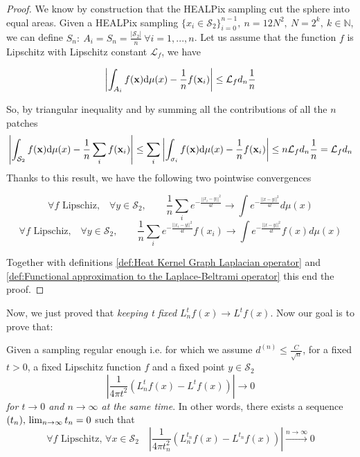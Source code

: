 \begin{proof}
	We know by construction that the HEALPix sampling cut the sphere into equal areas. Given a HEALPix sampling $\{x_i\in\mathcal S_2\}_{i=0}^{n-1},\ n=12N^2,\ N=2^k,\ k\in\mathbb N$, we can define $S_n: \ A_i=S_n=\frac{|\mathcal S_2|}{n}\ \forall i=1, ..., n$.
	Let us assume that the function $f$ is Lipschitz with Lipschitz constant $\mathcal L_f$, we have 
	
	$$\left| \int_{A_{i}}f({\bf x})\text{d}{\mu(x)} - \frac{1}{n}f(\mathbf x_i)\right| \leq \mathcal L_fd_{n}\frac{1}{n} $$

	So, by triangular inequality and by summing all the contributions of all the $n$ patches
	$$\left| \int_{\mathcal S_2}f({\bf x})\text{d}{\mu(x)} - \frac{1}{n}\sum_i f(\mathbf x_i)\right| \leq \sum_i \left| \int_{\sigma_{i}}f({\bf x})\text{d}{\mu(x)} - \frac{1}{n}f(\mathbf x_i)\right|\leq n  \mathcal L_fd_{n}\frac{1}{n} = \mathcal L_fd_{n}$$	
	Thanks to this result, we have the following two pointwise convergences
	
	$$\forall f \text{ Lipschiz,}\quad \forall y\in\mathcal S_2,  \quad\quad \frac{1}{n}\sum_i e^{-\frac{||x_i-y||^2}{4t}}\rightarrow \int e^{-\frac{||x-y||^2}{4t}}d\mu(x)$$
	$$\forall f \text{ Lipschiz,}\quad \forall y\in\mathcal S_2,  \quad\quad \frac{1}{n}\sum_i e^{-\frac{||x_i-y||^2}{4t}}f(x_i)\rightarrow \int e^{-\frac{||x-y||^2}{4t}}f(x)d\mu(x)$$
	
	Together with definitions \ref{def:Heat Kernel Graph Laplacian operator} and \ref{def:Functional approximation to the Laplace-Beltrami operator} this end the proof.
\end{proof}
\vspace{0.5cm}

Now, we just proved that \textit{keeping t fixed} $L_n^tf(x)\rightarrow L^tf(x)$. Now our goal is to prove that:

\vspace{0.5cm}
\begin{prop}\label{prop:2}
	Given a sampling regular enough i.e. for which we assume $d^{(n)}\leq \frac{C}{\sqrt{n}}$, for a fixed $t>0$, a fixed Lipschitz function $f$ and a fixed point $y\in\mathcal S_2$
$$\left|\frac{1}{4\pi t^2}\left(L_n^tf(x) -L^tf(x)\right)\right|\rightarrow0$$
\textit{for $t\to0$ and $n\to\infty$ at the same time}. In other words, there exists a sequence $(t_n), \\ \lim_{n\to\infty}t_n=0$ such that 
$$\forall f \text{ Lipschitz, } \forall x\in\mathcal S_2 \quad \left|\frac{1}{4\pi t_n^2}\left(L_n^{t_n}f(x) - L^{t_n}f(x)\right)\right|\xrightarrow{n\to \infty}0$$
\end{prop}
\vspace{0.5cm}

